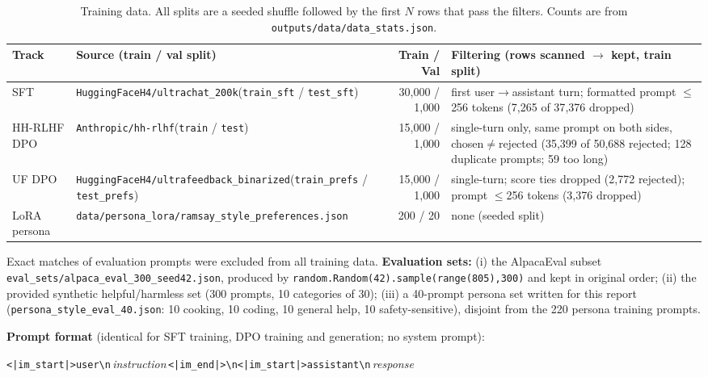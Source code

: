 \documentclass[10pt,a4paper]{article}
\newcommand{\code}[1]{\texttt{\small #1}}
\begin{document}
\begin{table}[h]
\centering\small
\caption{Training data. All splits are a seeded shuffle followed by the first $N$ rows that pass the filters. Counts are
from \code{outputs/data/data\_stats.json}.}
\label{tab:data}
\begin{tabularx}{\linewidth}{@{}l >{\raggedright\arraybackslash}p{6.3cm} r >{\raggedright\arraybackslash}X@{}}
\toprule
Track & Source (train / val split) & Train / Val & Filtering (rows scanned $\rightarrow$ kept, train split) \\
\midrule
SFT & \code{HuggingFaceH4/ultrachat\_200k}\newline(\code{train\_sft} / \code{test\_sft}) & 30{,}000 / 1{,}000 &
  first user$\rightarrow$assistant turn; formatted prompt $\le$256 tokens (7{,}265 of 37{,}376 dropped) \\
HH-RLHF DPO & \code{Anthropic/hh-rlhf}\newline(\code{train} / \code{test}) & 15{,}000 / 1{,}000 &
  single-turn only, same prompt on both sides, chosen$\ne$rejected (35{,}399 of 50{,}688 rejected; 128 duplicate prompts; 59 too long) \\
UF DPO & \code{HuggingFaceH4/ultrafeedback\_binarized}\newline(\code{train\_prefs} / \code{test\_prefs}) & 15{,}000 / 1{,}000 &
  single-turn; score ties dropped (2{,}772 rejected); prompt $\le$256 tokens (3{,}376 dropped) \\
LoRA persona & \code{data/persona\_lora/}\newline\code{ramsay\_style\_preferences.json} & 200 / 20 & none (seeded split) \\
\bottomrule
\end{tabularx}
\end{table}

Exact matches of evaluation prompts were excluded from all training data.
\textbf{Evaluation sets:}
(i) the AlpacaEval subset \code{eval\_sets/alpaca\_eval\_300\_seed42.json}, produced by
\code{random.Random(42).sample(range(805),300)} and kept in original order;
(ii) the provided synthetic helpful/harmless set (300 prompts, 10 categories of 30);
(iii) a 40-prompt persona set written for this report (\code{persona\_style\_eval\_40.json}: 10 cooking, 10 coding,
10 general help, 10 safety-sensitive), disjoint from the 220 persona training prompts.

\textbf{Prompt format} (identical for SFT training, DPO training and generation; no system prompt):

\begin{center}\small
\code{<|im\_start|>user\textbackslash n}\,\textit{instruction}\,\code{<|im\_end|>\textbackslash n<|im\_start|>assistant\textbackslash n}\,\textit{response}\,\code{<|endoftext|>}
\end{center}
\end{document}
